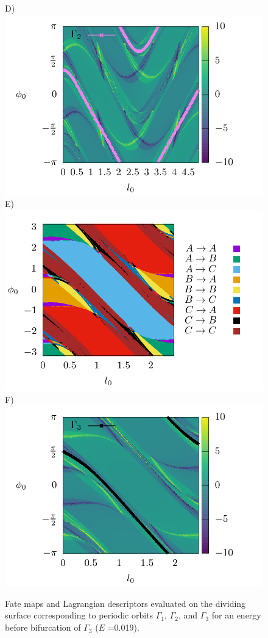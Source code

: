 \documentclass[10pt,aps,onecolumn,superscriptaddress]{revtex4-2}
\begin{document}
\begin{figure}[htbp]
	D)\includegraphics[scale=0.35]{ld_action_ds_gamma2_E_0019.png}
	E)\includegraphics[scale=0.35]{fate_map_ds_gamma3E_0019.png}
	F)\includegraphics[scale=0.35]{ld_action_ds_gamma3_E_0019.png}
	\caption{ Fate maps and Lagrangian descriptors evaluated on the dividing surface corresponding to periodic orbits $\Gamma_1$, $\Gamma_2$, and $\Gamma_3$ for an energy before bifurcation of $\Gamma_3$ ($E$ =0.019). }
	\label{fig:ld_fm_ds_E_0019}
\end{figure}
\end{document}
